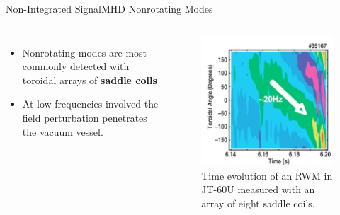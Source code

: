 \documentclass{beamer}
\begin{document}
\begin{frame}{Non-Integrated Signal}{MHD Nonrotating Modes }
	\begin{columns}
		\begin{itemize}
			\item Nonrotating modes are most commonly detected with toroidal arrays of \textbf{ saddle coils}
			\item At low frequencies involved the field perturbation penetrates the vacuum vessel.
		\end{itemize}
		\begin{figure}[ht]
			\begin{center}
				\includegraphics[width=0.6 \columnwidth]{RWM.png}
				\caption{\small  Time evolution of an RWM in JT-60U measured with an array of eight saddle coils.}
			\end{center}
		\end{figure}
 	 \end{columns}  	
\end{frame}

%


\end{document}
